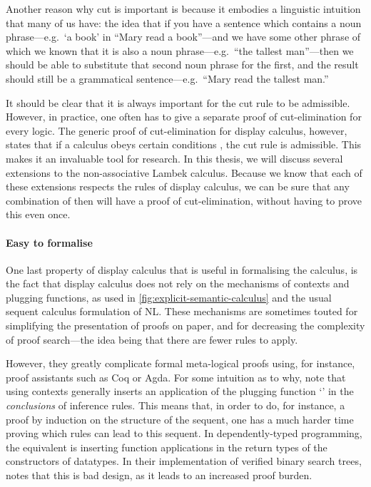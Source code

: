 Another reason why cut is important is because it embodies a
linguistic intuition that many of us have: the idea that if you have a
sentence which contains a noun phrase---e.g.\ `a book' in ``Mary read
a book''---and we have some other phrase of which we known that it is
also a noun phrase---e.g.\ ``the tallest man''---then we should be
able to substitute that second noun phrase for the first, and the
result should still be a grammatical sentence---e.g.\ ``Mary read the
tallest man.''

It should be clear that it is always important for the cut rule to be
admissible. However, in practice, one often has to give a separate
proof of cut-elimination for every logic. The generic proof of
cut-elimination for display calculus, however, states that if a
calculus obeys certain conditions \citep[see][]{gore1998}, the cut
rule is admissible.
This makes it an invaluable tool for research. In this thesis, we will
discuss several extensions to the non-associative Lambek calculus.
Because we know that each of these extensions respects the rules of
display calculus, we can be sure that any combination of then will
have a proof of cut-elimination, without having to prove this even
once.

\paragraph{Easy to formalise}
One last property of display calculus that is useful in formalising
the calculus, is the fact that display calculus does not rely on the
mechanisms of contexts and plugging functions, as used in
\autoref{fig:explicit-semantic-calculus} and the usual sequent
calculus formulation of NL.
These mechanisms are sometimes touted for simplifying the presentation
of proofs on paper, and for decreasing the complexity of proof
search---the idea being that there are fewer rules to apply.

However, they greatly complicate formal meta-logical proofs using, for
instance, proof assistants such as Coq or Agda.
For some intuition as to why, note that using contexts generally
inserts an application of the plugging function `\plug' in the
\emph{conclusions} of inference rules. This means that, in order to
do, for instance, a proof by induction on the structure of the
sequent, one has a much harder time proving which rules can lead to
this sequent.
In dependently-typed programming, the equivalent is inserting
function applications in the return types of the constructors of
datatypes. In their implementation of verified binary search trees,
\citet{mcbride2014} notes that this is bad design, as it leads to an
increased proof burden.

